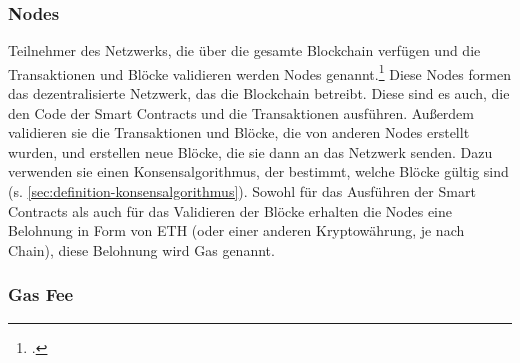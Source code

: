 \subsubsection{Nodes}
\label{sec:definition-nodes}
Teilnehmer des Netzwerks, die über die gesamte Blockchain verfügen und die Transaktionen und Blöcke validieren werden Nodes genannt.\footcites[Vgl. hierzu und im Folgenden][]{w12}[]{w13} 
Diese Nodes formen das dezentralisierte Netzwerk, das die Blockchain betreibt.
Diese sind es auch, die den Code der Smart Contracts und die Transaktionen ausführen.
Außerdem validieren sie die Transaktionen und Blöcke, die von anderen Nodes erstellt wurden, und erstellen neue Blöcke, die sie dann an das Netzwerk senden.
Dazu verwenden sie einen Konsensalgorithmus, der bestimmt, welche Blöcke gültig sind (s. \ref{sec:definition-konsensalgorithmus}). 
Sowohl für das Ausführen der Smart Contracts als auch für das Validieren der Blöcke erhalten die Nodes eine Belohnung in Form von ETH (oder einer anderen Kryptowährung, je nach Chain), diese Belohnung wird Gas genannt.

\subsubsection{Gas Fee}
\label{sec:definition-gas-fee}

